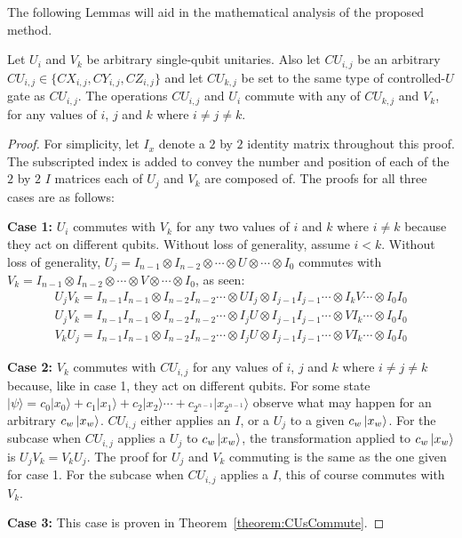 The following Lemmas will aid in the mathematical analysis of the proposed method. 
\begin{myLemmarep}
\label{lemma:commutingEncryptionOperators}
Let $U_i$ and $V_k$ be arbitrary single-qubit unitaries. Also let $\mathit{CU}_{i,j}$ be an arbitrary $\mathit{CU}_{i,j} \in \{\mathit{CX}_{i,j}, \mathit{CY}_{i,j}, \mathit{CZ}_{i,j}\}$ and let $\mathit{CU}_{k,j}$ be set to the same type of controlled-$U$ gate as $\mathit{CU}_{i,j}$. The operations $\mathit{CU}_{i,j}$ and $U_i$ commute with any of $\mathit{CU}_{k,j}$ and $V_k$, for any values of $i$, $j$ and $k$ where $i \neq j \neq k$.
\end{myLemmarep}
\begin{proof}
For simplicity, let $I_x$ denote a $2$ by $2$ identity matrix throughout this proof. The subscripted index is added to convey the number and position of each of the $2$ by $2$ $I$ matrices each of $U_j$ and $V_k$ are composed of. The proofs for all three cases are as follows:

\textbf{Case 1:} $U_i$ commutes with $V_k$ for any two values of $i$ and $k$ where $i \neq k$ because they act on different qubits. Without loss of generality, assume $i < k$. Without loss of generality, $U_j = I_{n-1} \otimes I_{n-2} \otimes \cdots \otimes U \otimes \cdots \otimes I_0$ commutes with $V_k = I_{n-1} \otimes I_{n-2} \otimes \cdots \otimes V \otimes \cdots \otimes I_0$, as seen:
\begin{align}
U_jV_k = I_{n-1}I_{n-1} \otimes I_{n-2}I_{n-2} \cdots \otimes UI_j \otimes I_{j-1}I_{j-1} \cdots \otimes I_kV \cdots \otimes I_0I_0\\
U_jV_k = I_{n-1}I_{n-1} \otimes I_{n-2}I_{n-2} \cdots \otimes I_jU \otimes I_{j-1}I_{j-1} \cdots \otimes VI_k \cdots \otimes I_0I_0\\
V_kU_j = I_{n-1}I_{n-1} \otimes I_{n-2}I_{n-2} \cdots \otimes I_jU \otimes I_{j-1}I_{j-1} \cdots \otimes VI_k \cdots \otimes I_0I_0
\end{align}

\textbf{Case 2:} $V_k$ commutes with $\mathit{CU}_{i,j}$ for any values of $i$, $j$ and $k$ where $i \neq j \neq k$ because, like in case 1, they act on different qubits. For some state $|\psi\rangle = c_0|x_0\rangle + c_1|x_1\rangle + c_2|x_2\rangle \cdots + c_{2^{n-1}}|x_{2^{n-1}}\rangle$ observe what may happen for an arbitrary $c_w\ket{x_w}$. $\mathit{CU}_{i,j}$ either applies an $I$, or a $U_j$ to a given $c_w\ket{x_w}$. For the subcase when $\mathit{CU}_{i,j}$ applies a $U_j$ to $c_w\ket{x_w}$, the transformation applied to $c_w\ket{x_w}$ is $U_jV_k = V_kU_j$. The proof for $U_j$ and $V_k$ commuting is the same as the one given for case 1. For the subcase when $\mathit{CU}_{i,j}$ applies a $I$, this of course commutes with $V_k$.

\textbf{Case 3:} This case is proven in Theorem~\ref{theorem:CUsCommute}.
\end{proof}
